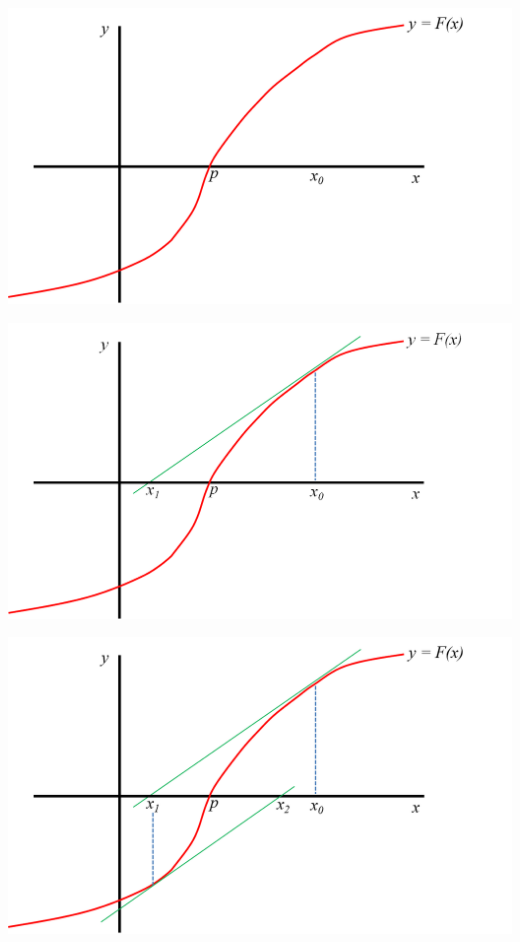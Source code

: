 \documentclass[]{book}
\begin{document}
\begin{center}\includegraphics[width=0.9\linewidth]{Plots/U2/nr1} \end{center}

\begin{center}\includegraphics[width=0.9\linewidth]{Plots/U2/nr2} \end{center}

\begin{center}\includegraphics[width=0.9\linewidth]{Plots/U2/nr3} \end{center}
\end{document}
